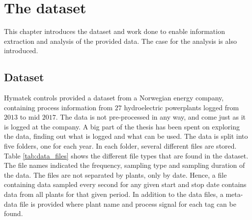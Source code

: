 \chapter{The dataset}\label{cha:data}

This chapter introduces the dataset and work done to enable information extraction and analysis of the provided data. The case for the analysis is also introduced.








\section{Dataset}\label{sec:dataset}
    Hymatek controls provided a dataset from a Norwegian energy company, containing process information from $27$ hydroelectric powerplants logged from $2013$ to mid $2017$. The data is not pre-processed in any way, and come just as it is logged at the company. A big part of the thesis has been spent on exploring the data, finding out what is logged and what can be used. The data is split into five folders, one for each year. In each folder, several different files are stored. Table \ref{tab:data_files} shows the different file types that are found in the dataset. The file names indicated the frequency, sampling type and sampling duration of the data. The files are not separated by plants, only by date. Hence, a file containing data sampled every second for any given start and stop date contains data from all plants for that given period. In addition to the data files, a meta-data file is provided where plant name and process signal for each tag can be found.
    
